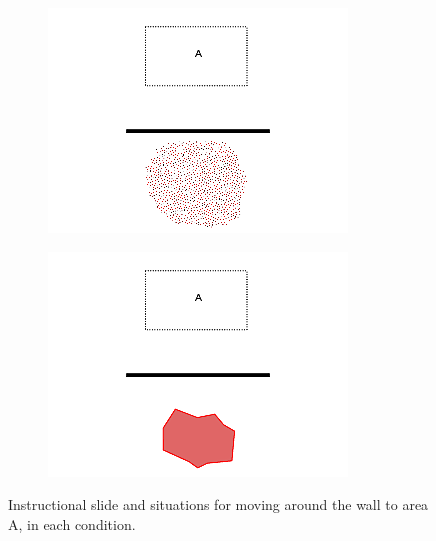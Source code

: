 \begin{figure}
\begin{subfigure}{0.4\textwidth}
		\includegraphics[width=\linewidth]{../ui_experiment/slide_images/Swarm_Robot_Control_-_1000_Robot_0005.png}
	\end{subfigure}
	\begin{subfigure}{0.4\textwidth}
		\includegraphics[width=\linewidth]{../ui_experiment/slide_images/Swarm_Robot_Control_-_Unknown_Number_of_Robots_0007.png}
	\end{subfigure}
	\caption{Instructional slide and situations for moving around the wall to area A, in each condition.}
	\label{fig:move_around_wall}
\end{figure}

